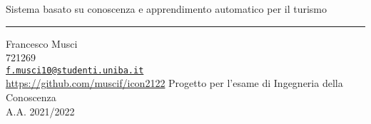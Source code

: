 \documentclass[12pt, a4paper]{extarticle}
\newcommand{\seccolor}{\color{DodgerBlue3}}
\begin{document}
\selectfont
\begin{titlepage}
	\flushright
	\hfill
	\vfill
	{\LARGE Sistema basato su conoscenza e apprendimento automatico per il turismo \par}
	{\seccolor\rule[5pt]{\textwidth}{.8pt} \par}
  {\large Francesco Musci}\\
  721269\\
  \href{mailto:f.musci10@studenti.uniba.it}
  {\texttt{f.musci10@studenti.uniba.it}}\\
  \url{https://github.com/muscif/icon2122}
	\vfill
    Progetto per l'esame di Ingegneria della Conoscenza\\
    A.A. 2021/2022
\end{titlepage}
\newpage
\pagestyle{empty}
\
\newpage
\begin{titlepage}
    \tableofcontents
\end{titlepage}

\pagestyle{plain}



\newpage
\end{document}
